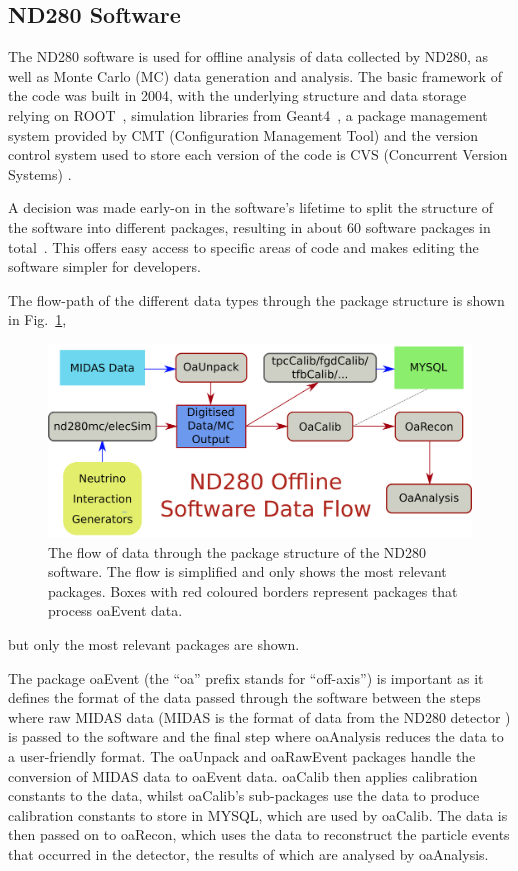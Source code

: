 \documentclass[aps,pra,12pt,notitlepage,tightenlines]{revtex4-1}
\begin{document}
\subsection{ND280 Software}
The ND280 software is used for offline analysis of data collected by ND280, as well as Monte Carlo (MC) data generation and analysis. The basic framework of the code was built in 2004, with the underlying structure and data storage relying on ROOT~\cite{Brun1997}, simulation libraries from Geant4~\cite{Agostinelli2003}, a package management system provided by CMT (Configuration Management Tool) \cite{Arnault:2000vu} and the version control system used to store each version of the code is CVS (Concurrent Version Systems) \cite{Berliner2001}.

A decision was made early-on in the software's lifetime to split the structure of the software into different packages, resulting in about 60 software packages in total~\cite{ABE2011106}. This offers easy access to specific areas of code and makes editing the software simpler for developers. 

The flow-path of the different data types through the package structure is shown in Fig.~\ref{fig:struct}, 
\begin{figure}
 \includegraphics[scale=0.5]{dataflow.png}
 \caption{The flow of data through the package structure of the ND280 software. The flow is simplified and only shows the most relevant packages. Boxes with red coloured borders represent packages that process oaEvent data.}
 \label{fig:struct}
\end{figure}
but only the most relevant packages are shown.

The package oaEvent (the ``oa'' prefix stands for ``off-axis'') is important as it defines the format of the data passed through the software between the steps where raw MIDAS data (MIDAS is the format of data from the ND280 detector \cite{Ritt2001}) is passed to the software and the final step where oaAnalysis reduces the data to a user-friendly format. The oaUnpack and oaRawEvent packages handle the conversion of MIDAS data to oaEvent data. oaCalib then applies calibration constants to the data, whilst oaCalib's sub-packages use the data to produce calibration constants to store in MYSQL, which are used by oaCalib. The data is then passed on to oaRecon, which uses the data to reconstruct the particle events that occurred in the detector, the results of which are analysed by oaAnalysis.
\end{document}
